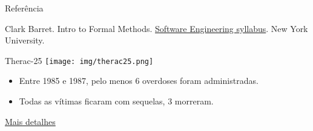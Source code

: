 
\lecturetitle{\course}{\insertlecture}

\frame{\maketitle}

  \begin{frame}{Referência}
  \begin{thebibliography}{10}
    \beamertemplatebookbibitems
    Clark Barret.
    \newblock Intro to Formal Methods.
    \newblock \href{https://cs.nyu.edu/courses/spring08/V22.0474-001/syllabus.html}{Software Engineering syllabus}.
    \newblock New York University.
  \end{thebibliography}  
\end{frame}

\begin{frame}{Therac-25}
  \texttt{[image: img/therac25.png]}
  \bigskip
  
  \begin{itemize}
  \item Entre 1985 e 1987, pelo menos 6 overdoses foram administradas.
  \item Todas as vítimas ficaram com sequelas, 3 morreram.
  \end{itemize}\bigskip

  \href{https://www.youtube.com/watch?v=qgusHewRFgA}{Mais detalhes}
  
\end{frame}

